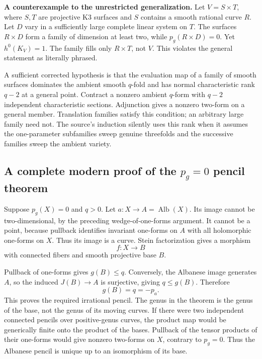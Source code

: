\textbf{A counterexample to the unrestricted generalization.} Let \(V=S\times T\), where \(S,T\) are projective K3 surfaces and \(S\) contains a smooth rational curve \(R\). Let \(D\) vary in a sufficiently large complete linear system on \(T\). The surfaces \(R\times D\) form a family of dimension at least two, while \(p_g(R\times D)=0\). Yet \(h^0(K_V)=1\). The family fills only \(R\times T\), not \(V\). This violates the general statement as literally phrased.

A sufficient corrected hypothesis is that the evaluation map of a family of smooth surfaces dominates the ambient smooth \(q\)-fold and has normal characteristic rank \(q-2\) at a general point. Contract a nonzero ambient \(q\)-form with \(q-2\) independent characteristic sections. Adjunction gives a nonzero two-form on a general member. Translation families satisfy this condition; an arbitrary large family need not. The source's induction silently uses this rank when it assumes the one-parameter subfamilies sweep genuine threefolds and the successive families sweep the ambient variety.

\subsection{A complete modern proof of the \texorpdfstring{$p_g=0$}{pg=0} pencil theorem}\label{cp2-ix-11-2}

Suppose \(p_g(X)=0\) and \(q>0\). Let \(a:X\to A=\operatorname{Alb}(X)\). Its image cannot be two-dimensional, by the preceding wedge-of-one-forms argument. It cannot be a point, because pullback identifies invariant one-forms on \(A\) with all holomorphic one-forms on \(X\). Thus its image is a curve. Stein factorization gives a morphism
\[
f:X\longrightarrow B
\]
with connected fibers and smooth projective base \(B\).

Pullback of one-forms gives \(g(B)\leq q\). Conversely, the Albanese image generates \(A\), so the induced \(J(B)\to A\) is surjective, giving \(q\leq g(B)\). Therefore
\begin{equation*}\label{cp2-ix-eq10}
g(B)=q=-p_a.
\tag{IX.10}
\end{equation*}
This proves the required irrational pencil. The genus in the theorem is the genus of the base, not the genus of its moving curves. If there were two independent connected pencils over positive-genus curves, the product map would be generically finite onto the product of the bases. Pullback of the tensor products of their one-forms would give nonzero two-forms on \(X\), contrary to \(p_g=0\). Thus the Albanese pencil is unique up to an isomorphism of its base.

